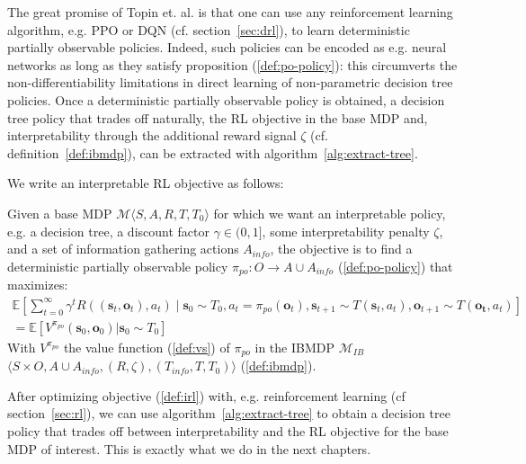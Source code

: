 The great promise of Topin et. al. is that one can use any reinforcement learning algorithm, e.g. PPO or DQN (cf. section~\ref{sec:drl}), to learn deterministic partially observable policies. Indeed, such policies can be encoded as e.g. neural networks as long as they satisfy proposition (\ref{def:po-policy}): this circumverts the non-differentiability limitations in direct learning of non-parametric decision tree policies.
Once a deterministic partially observable policy is obtained, a decision tree policy that trades off naturally, the RL objective in the base MDP and, interpretability through the additional reward signal $\zeta$ (cf. definition~\ref{def:ibmdp}), can be extracted with algorithm~\ref{alg:extract-tree}.

We write an interpretable RL objective as follows:
\begin{definition}\label{def:irl}
    Given a base MDP $\mathcal{M} \langle S, A, R, T, T_0 \rangle$ for which we want an interpretable policy, e.g. a decision tree, a discount factor $\gamma \in (0,1]$, some interpretability penalty $\zeta$, and a set of information gathering actions $A_{info}$, the objective is to find a deterministic partially observable policy $\pi_{po}: O \rightarrow A\cup A_{info}$ (\ref{def:po-policy}) that maximizes:
\begin{align*}
    \mathbb{E}\left[\sum_{t=0}^{\infty} \gamma^t R((\boldsymbol{s}_t, \boldsymbol{o}_t), a_t) \mid \boldsymbol{s}_0 \sim T_0, a_t = \pi_{po}(\boldsymbol{o}_t), \boldsymbol{s}_{t+1} \sim T(\boldsymbol{s}_t, a_t), \boldsymbol{o}_{t+1}\sim T(\boldsymbol{o_t}, a_t)\right]\\
    = \mathbb{E}[V^{\pi_{po}}(\boldsymbol{s}_0, \boldsymbol{o}_0)| \boldsymbol{s}_0\sim T_0]
\end{align*}
With $V^{\pi_{po}}$ the value function (\ref{def:vs}) of $\pi_{po}$ in the IBMDP $\mathcal{M}_{IB}$ $\langle S \times O,A \cup A_{info}, (R, \zeta), (T_{info}, T, T_0)\rangle$ (\ref{def:ibmdp}).
\end{definition}

After optimizing objective (\ref{def:irl}) with, e.g. reinforcement learning (cf section~\ref{sec:rl}), we can use algorithm~\ref{alg:extract-tree} to obtain a decision tree policy that trades off between interpretability and the RL objective for the base MDP of interest.
This is exactly what we do in the next chapters.
        
